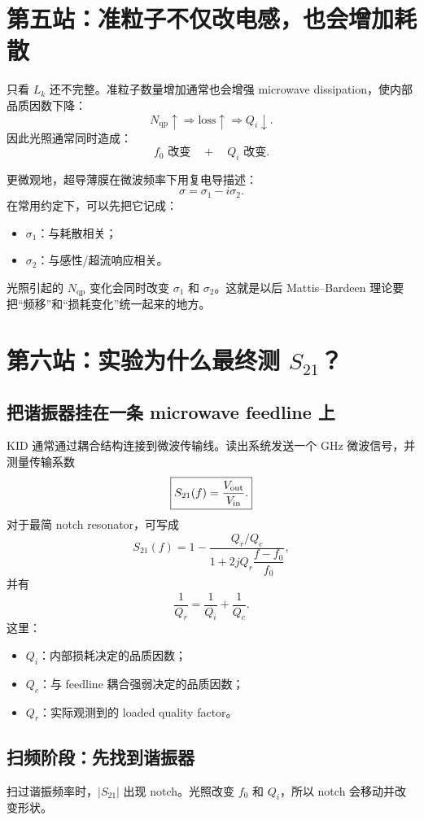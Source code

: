 \documentclass[11pt,a4paper,openany]{ctexrep}
\newcommand{\qp}{\mathrm{qp}}
\begin{document}
\section{第五站：准粒子不仅改电感，也会增加耗散}
只看 $L_k$ 还不完整。准粒子数量增加通常也会增强 microwave dissipation，使内部品质因数下降：
\[
N_{\qp}\uparrow\Rightarrow \text{loss}\uparrow\Rightarrow Q_i\downarrow.
\]
因此光照通常同时造成：
\[
\boxed{f_0\text{ 改变}\quad +\quad Q_i\text{ 改变}.}
\]

更微观地，超导薄膜在微波频率下用复电导描述：
\[
\boxed{\sigma=\sigma_1-i\sigma_2.}
\]
在常用约定下，可以先把它记成：
\begin{itemize}
  \item $\sigma_1$：与耗散相关；
  \item $\sigma_2$：与感性/超流响应相关。
\end{itemize}
光照引起的 $N_{\qp}$ 变化会同时改变 $\sigma_1$ 和 $\sigma_2$。这就是以后 Mattis--Bardeen 理论要把“频移”和“损耗变化”统一起来的地方。

\section{第六站：实验为什么最终测 $S_{21}$？}

\subsection{把谐振器挂在一条 microwave feedline 上}
KID 通常通过耦合结构连接到微波传输线。读出系统发送一个 GHz 微波信号，并测量传输系数
\[
\boxed{S_{21}(f)=\frac{V_{\rm out}}{V_{\rm in}}.}
\]
对于最简 notch resonator，可写成
\[
S_{21}(f)=1-\frac{Q_r/Q_c}{1+2jQ_r\dfrac{f-f_0}{f_0}},
\]
并有
\[
\boxed{\frac{1}{Q_r}=\frac{1}{Q_i}+\frac{1}{Q_c}.}
\]
这里：
\begin{itemize}
  \item $Q_i$：内部损耗决定的品质因数；
  \item $Q_c$：与 feedline 耦合强弱决定的品质因数；
  \item $Q_r$：实际观测到的 loaded quality factor。
\end{itemize}

\subsection{扫频阶段：先找到谐振器}
扫过谐振频率时，$|S_{21}|$ 出现 notch。光照改变 $f_0$ 和 $Q_i$，所以 notch 会移动并改变形状。
\end{document}
